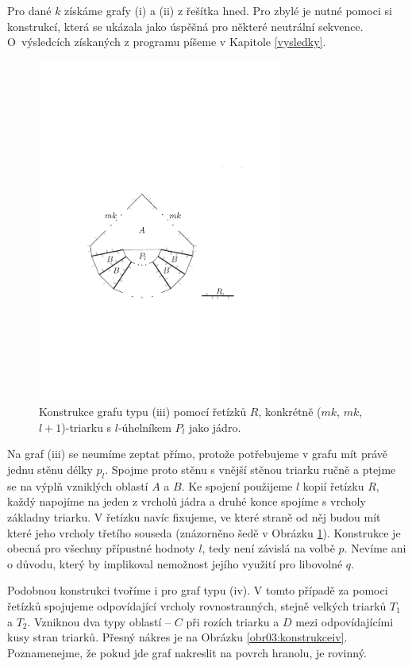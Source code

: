 Pro dané $k$ získáme grafy (i) a (ii) z řešítka hned. Pro zbylé je nutné pomoci si konstrukcí, která se ukázala jako úspěšná pro některé neutrální sekvence. O~výsledcích získaných z programu píšeme v Kapitole \ref{vysledky}.

\begin{figure}[h]\centering
\includegraphics[width = 80mm]{../img/iii-construction}
\caption{Konstrukce grafu typu (iii) pomocí řetízků $R$, konkrétně ($mk$, $mk$, $l+1$)-triarku s $l$-úhelníkem $P_l$ jako jádro.}
\label{obr03:konstrukceiii}
\end{figure}

Na graf (iii) se neumíme zeptat přímo, protože potřebujeme v grafu mít právě jednu stěnu délky $p_l$. Spojme proto stěnu s vnější stěnou triarku ručně a ptejme se na výplň vzniklých oblastí $A$ a $B$. Ke spojení použijeme $l$ kopií řetízku $R$, každý napojíme na jeden z vrcholů jádra a druhé konce spojíme s  vrcholy základny triarku. V řetízku navíc fixujeme, ve které straně od něj budou mít které jeho vrcholy třetího souseda (znázorněno šedě v Obrázku \ref{obr03:konstrukceiii}). Konstrukce je obecná pro všechny přípustné hodnoty $l$, tedy není závislá na volbě $p$. Nevíme ani o důvodu, který by implikoval nemožnost jejího využití pro libovolné $q$.


Podobnou konstrukci tvoříme i pro graf typu (iv). V tomto případě za pomoci řetízků spojujeme odpovídající vrcholy rovnostranných, stejně velkých triarků $T_1$ a $T_2$. Vzniknou dva typy oblastí -- $C$ při rozích triarku a $D$ mezi odpovídajícími kusy stran triarků. Přesný nákres je na Obrázku \ref{obr03:konstrukceiv}. Poznamenejme, že pokud jde graf nakreslit na povrch hranolu, je rovinný. 


